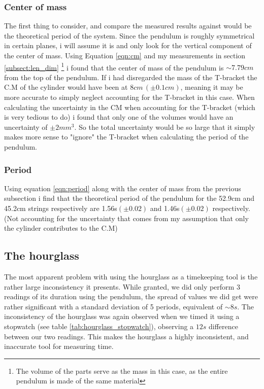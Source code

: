 \documentclass[%
 reprint,
 amsmath,amssymb,
 aps,
]{revtex4-1}
\begin{document}
		\subsubsection{Center of mass}
		The first thing to consider, and compare the measured results against would be the theoretical period of the system. Since the pendulum is roughly symmetrical in certain planes, i will assume it is and only look for the vertical component of the center of mass. Using Equation \ref{eqn:cm} and my measurements in section \ref{subsect:len_dim} \footnote{The volume of the parts serve as the mass in this case, as the entire pendulum is made of the same material} i found that the center of mass of the pendulum is $\sim 7.79cm$ from the top of the pendulum. If i had disregarded the mass of the T-bracket the C.M of the cylinder would have been at $8cm\,(\pm0.1cm)$, meaning it may be more accurate to simply neglect accounting for the T-bracket in this case. When calculating the uncertainty in the CM when accounting for the T-bracket (which is very tedious to do) i found that only one of the volumes would have an uncertainty of $\pm 2mm^3$. So the total uncertainty would be so large that it simply makes more sense to "ignore" the T-bracket when calculating the period of the pendulum.	
		\subsubsection{Period}
		Using equation \ref{eqn:period} along with the center of mass from the previous subsection i find that the theoretical period of the pendulum for the 52.9cm and 45.2cm strings respectively are 1.56s$(\pm 0.02)$ and 1.46s$(\pm 0.02)$ respectively. (Not accounting for the uncertainty that comes from my assumption that only the cylinder contributes to the C.M)

	\subsection{The hourglass}
		The most apparent problem with using the hourglass as a timekeeping tool is the rather large inconsistency it presents. While granted, we did only perform 3 readings of its duration using the pendulum, the spread of values we did get were rather significant with a standard deviation of 5 periods, equivalent of $\sim 8s$. The inconsistency of the hourglass was again observed when we timed it using a stopwatch (see table \ref{tab:hourglass_stopwatch}), observing a $12s$ difference between our two readings. This makes the hourglass a highly inconsistent, and inaccurate tool for measuring time.
\end{document}
